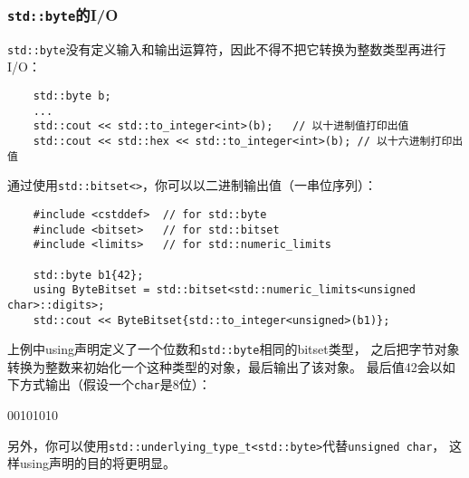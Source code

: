 \subsubsection{\texttt{std::byte}的I/O}\label{ch18.2.2.2}
\texttt{std::byte}没有定义输入和输出运算符，因此不得不把它转换为整数类型再进行I/O：
\begin{lstlisting}
    std::byte b;
    ...
    std::cout << std::to_integer<int>(b);   // 以十进制值打印出值
    std::cout << std::hex << std::to_integer<int>(b); // 以十六进制打印出值
\end{lstlisting}
通过使用\texttt{std::bitset<>}，你可以以二进制输出值（一串位序列）：
\begin{lstlisting}
    #include <cstddef>  // for std::byte
    #include <bitset>   // for std::bitset
    #include <limits>   // for std::numeric_limits

    std::byte b1{42};
    using ByteBitset = std::bitset<std::numeric_limits<unsigned char>::digits>;
    std::cout << ByteBitset{std::to_integer<unsigned>(b1)};
\end{lstlisting}
上例中using声明定义了一个位数和\texttt{std::byte}相同的bitset类型，
之后把字节对象转换为整数来初始化一个这种类型的对象，最后输出了该对象。
最后值42会以如下方式输出（假设一个\texttt{char}是8位）：
\begin{blacklisting}
    00101010
\end{blacklisting}
另外，你可以使用\texttt{std::underlying\_type\_t<std::byte>}代替\texttt{unsigned char}，
这样using声明的目的将更明显。

